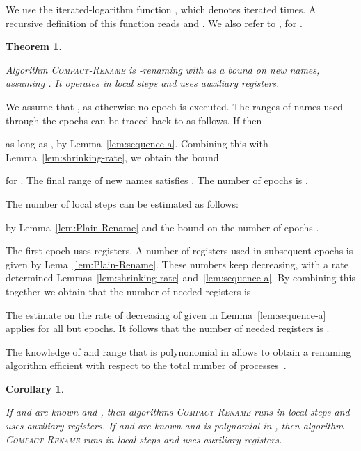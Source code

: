 \documentclass[11pt]{article}
\newcommand{\qed}{\hfill  \smallbreak}
\newenvironment{proof}{\noindent{\bf Proof:}}{\qed}
\newtheorem{theorem}{Theorem}
\newtheorem{corollary}{Corollary}
\begin{document}
We use the iterated-logarithm function , which denotes  iterated  times.
A recursive definition of this function reads  and .
We also refer to , for .



\begin{theorem}
\label{thm:compact-rename}

Algorithm \textsc{Compact-Rename} is -renaming with  as a bound on new names,  assuming .
It operates in  local steps and uses  auxiliary registers. 
\end{theorem}

\begin{proof}
We assume  that , as otherwise no epoch is executed.
The ranges of names used through the epochs can be traced back to  as follows.
If  then 

as long as , by Lemma~\ref{lem:sequence-a}.
Combining this with Lemma~\ref{lem:shrinking-rate}, we obtain the bound

 for .
The final range of new names  satisfies .
The number of epochs is . 


The number of local steps can be estimated as follows:

by Lemma~\ref{lem:Plain-Rename} and the bound  on the number of epochs  .

The first epoch uses  registers.
A number of registers used in subsequent epochs is given by Lema~\ref{lem:Plain-Rename}.
These numbers keep decreasing, with a rate determined Lemmas~\ref{lem:shrinking-rate} and~\ref{lem:sequence-a}.
By combining this together we obtain that the number of needed registers  is

The estimate on the rate of decreasing of  given in Lemma~\ref{lem:sequence-a} applies for all but  epochs.
It follows that the number of needed registers is .
\end{proof}

The knowledge of  and range  that is polynonomial in  allows to obtain a renaming algorithm efficient with respect to the total number of processes~.



\begin{corollary}
\label{cor:known-k-and-N-rename}

If  and  are known and , then algorithms \textsc{Compact-Rename} runs in  local steps and uses  auxiliary registers. 
If  and  are known and  is polynomial in , then algorithm \textsc{Compact-Rename} runs in  local steps and uses  auxiliary registers. 
\end{corollary}
\end{document}
